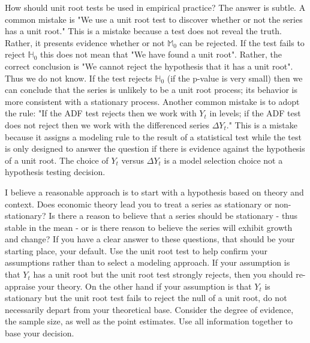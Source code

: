 \documentclass[10pt]{article}
\begin{document}
How should unit root tests be used in empirical practice? The answer is subtle. A common mistake is "We use a unit root test to discover whether or not the series has a unit root." This is a mistake because a test does not reveal the truth. Rather, it presents evidence whether or not $\mathbb{M}_{0}$ can be rejected. If the test fails to reject $\mathbb{H}_{0}$ this does not mean that "We have found a unit root". Rather, the correct conclusion is "We cannot reject the hypothesis that it has a unit root". Thus we do not know. If the test rejects $\mathbb{H}_{0}$ (if the p-value is very small) then we can conclude that the series is unlikely to be a unit root process; its behavior is more consistent with a stationary process. Another common mistake is to adopt the rule: "If the ADF test rejects then we work with $Y_{t}$ in levels; if the ADF test does not reject then we work with the differenced series $\Delta Y_{t}$." This is a mistake because it assigns a modeling rule to the result of a statistical test while the test is only designed to answer the question if there is evidence against the hypothesis of a unit root. The choice of $Y_{t}$ versus $\Delta Y_{t}$ is a model selection choice not a hypothesis testing decision.

I believe a reasonable approach is to start with a hypothesis based on theory and context. Does economic theory lead you to treat a series as stationary or non-stationary? Is there a reason to believe that a series should be stationary - thus stable in the mean - or is there reason to believe the series will exhibit growth and change? If you have a clear answer to these questions, that should be your starting place, your default. Use the unit root test to help confirm your assumptions rather than to select a modeling approach. If your assumption is that $Y_{t}$ has a unit root but the unit root test strongly rejects, then you should re-appraise your theory. On the other hand if your assumption is that $Y_{t}$ is stationary but the unit root test fails to reject the null of a unit root, do not necessarily depart from your theoretical base. Consider the degree of evidence, the sample size, as well as the point estimates. Use all information together to base your decision.
\end{document}
